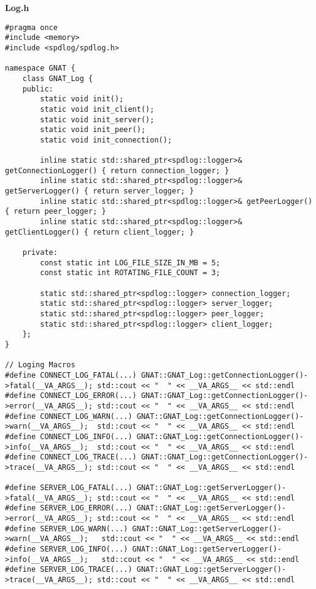\textbf{Log.h}
\begin{lstlisting}
#pragma once
#include <memory>
#include <spdlog/spdlog.h>

namespace GNAT {
	class GNAT_Log {
	public:
		static void init();
		static void init_client();
		static void init_server();
		static void init_peer();
		static void init_connection();

		inline static std::shared_ptr<spdlog::logger>& getConnectionLogger() { return connection_logger; }
		inline static std::shared_ptr<spdlog::logger>& getServerLogger() { return server_logger; }
		inline static std::shared_ptr<spdlog::logger>& getPeerLogger() { return peer_logger; }
		inline static std::shared_ptr<spdlog::logger>& getClientLogger() { return client_logger; }

	private:
		const static int LOG_FILE_SIZE_IN_MB = 5;
		const static int ROTATING_FILE_COUNT = 3;

		static std::shared_ptr<spdlog::logger> connection_logger;
		static std::shared_ptr<spdlog::logger> server_logger;
		static std::shared_ptr<spdlog::logger> peer_logger;
		static std::shared_ptr<spdlog::logger> client_logger;
	};
}

// Loging Macros
#define CONNECT_LOG_FATAL(...) GNAT::GNAT_Log::getConnectionLogger()->fatal(__VA_ARGS__); std::cout << "  " << __VA_ARGS__ << std::endl
#define CONNECT_LOG_ERROR(...) GNAT::GNAT_Log::getConnectionLogger()->error(__VA_ARGS__); std::cout << "  " << __VA_ARGS__ << std::endl
#define CONNECT_LOG_WARN(...) GNAT::GNAT_Log::getConnectionLogger()->warn(__VA_ARGS__);	 std::cout << "  " << __VA_ARGS__ << std::endl
#define CONNECT_LOG_INFO(...) GNAT::GNAT_Log::getConnectionLogger()->info(__VA_ARGS__);	 std::cout << "  " << __VA_ARGS__ << std::endl
#define CONNECT_LOG_TRACE(...) GNAT::GNAT_Log::getConnectionLogger()->trace(__VA_ARGS__); std::cout << "  " << __VA_ARGS__ << std::endl

#define SERVER_LOG_FATAL(...) GNAT::GNAT_Log::getServerLogger()->fatal(__VA_ARGS__); std::cout << "  " << __VA_ARGS__ << std::endl
#define SERVER_LOG_ERROR(...) GNAT::GNAT_Log::getServerLogger()->error(__VA_ARGS__); std::cout << "  " << __VA_ARGS__ << std::endl
#define SERVER_LOG_WARN(...) GNAT::GNAT_Log::getServerLogger()->warn(__VA_ARGS__);	 std::cout << "  " << __VA_ARGS__ << std::endl
#define SERVER_LOG_INFO(...) GNAT::GNAT_Log::getServerLogger()->info(__VA_ARGS__);	 std::cout << "  " << __VA_ARGS__ << std::endl
#define SERVER_LOG_TRACE(...) GNAT::GNAT_Log::getServerLogger()->trace(__VA_ARGS__); std::cout << "  " << __VA_ARGS__ << std::endl


\end{lstlisting}

